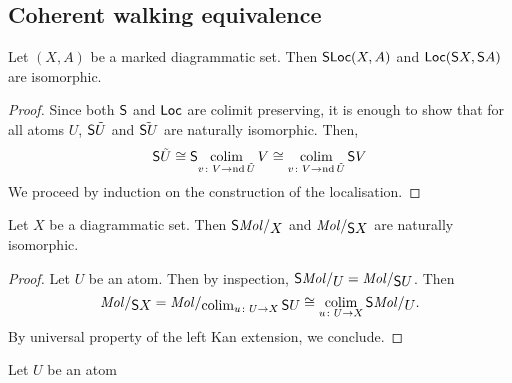 \subsection{Coherent walking equivalence}

\begin{lem} \label{lem:suspension_walking_globe_is_walking}
    Let \( (X, A) \) be a marked diagrammatic set.
    Then \( \mathsf{S}{\operatorname{\mathsf{Loc}} (X, A)} \) and \( \operatorname{\mathsf{Loc}} (\mathsf{S}{X}, \mathsf{S}{A}) \) are isomorphic. 
\end{lem}
\begin{proof}
    Since both \( \mathsf{S}{} \) and \( \operatorname{\mathsf{Loc}} \) are colimit preserving, it is enough to show that for all atoms \( U \), \( \mathsf{S}{\tilde{U}} \) and \( \tilde{\mathsf{S}{U}} \) are naturally isomorphic.
    Then, 
    \begin{equation*}
        \mathsf{S}{\tilde{U}} \cong \mathsf{S}{\operatorname*{colim}_{v \colon V \to \operatorname{nd} \tilde{U}} V} \cong \operatorname*{colim}_{v \colon V \to \operatorname{nd} \tilde{U}} \mathsf{S}{V}
    \end{equation*}
    We proceed by induction on the construction of the localisation. 
\end{proof}


\begin{lem} \label{lem:suspension_commutes_dgm_stricter}
    Let \( X \) be a diagrammatic set.
    Then \( \sus{\molecin{X}} \) and \( \molecin{\sus{X}} \) are naturally isomorphic.
\end{lem}
\begin{proof}
    Let \( U \) be an atom.
    Then by inspection, \( \sus{\molecin{U}} = \molecin{\sus{U}} \).
    Then
    \begin{equation*}
        \molecin{\sus{X}} = \molecin{\colim_{u \colon U \to X} \sus{U}} \cong \colim_{u \colon U \to X} \sus{\molecin{U}}.
    \end{equation*}
    By universal property of the left Kan extension, we conclude.
\end{proof}



\begin{prop}\label{prop:compositor_is_acyclic_atom_case}
    Let \( U \) be an atom
\end{prop}